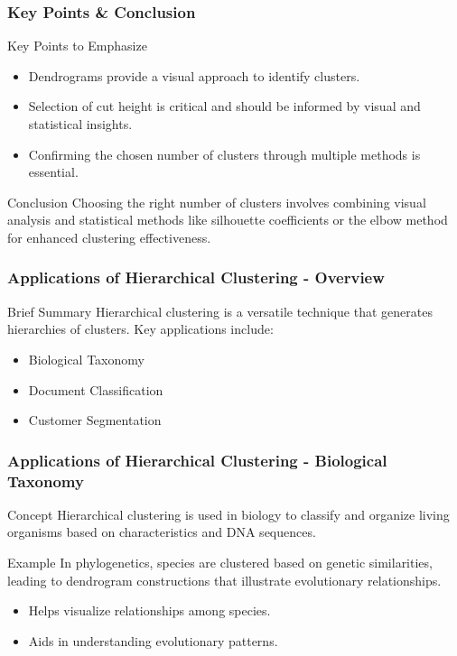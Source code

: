 \documentclass[aspectratio=169]{beamer}
\begin{document}
\begin{frame}[fragile]
    \frametitle{Key Points & Conclusion}
    \begin{block}{Key Points to Emphasize}
        \begin{itemize}
            \item Dendrograms provide a visual approach to identify clusters.
            \item Selection of cut height is critical and should be informed by visual and statistical insights.
            \item Confirming the chosen number of clusters through multiple methods is essential.
        \end{itemize}
    \end{block}

    \begin{block}{Conclusion}
        Choosing the right number of clusters involves combining visual analysis and statistical methods like silhouette coefficients or the elbow method for enhanced clustering effectiveness.
    \end{block}
\end{frame}

\begin{frame}[fragile]
    \frametitle{Applications of Hierarchical Clustering - Overview}
    \begin{block}{Brief Summary}
        Hierarchical clustering is a versatile technique that generates hierarchies of clusters. Key applications include:
        \begin{itemize}
            \item Biological Taxonomy
            \item Document Classification
            \item Customer Segmentation
        \end{itemize}
    \end{block}
\end{frame}

\begin{frame}[fragile]
    \frametitle{Applications of Hierarchical Clustering - Biological Taxonomy}
    \begin{block}{Concept}
        Hierarchical clustering is used in biology to classify and organize living organisms based on characteristics and DNA sequences.
    \end{block}
    
    \begin{block}{Example}
        In phylogenetics, species are clustered based on genetic similarities, leading to dendrogram constructions that illustrate evolutionary relationships. 
    \end{block}

    \begin{itemize}
        \item Helps visualize relationships among species.
        \item Aids in understanding evolutionary patterns.
    \end{itemize}
\end{frame}
\end{document}

